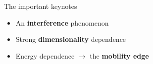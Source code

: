 \documentclass[1pt]{beamer}
\begin{document}
\begin{frame}{The important keynotes}
\begin{minipage}[c]{0.9\textwidth}
\begin{itemize}
\item An \textbf{interference} phenomenon
\vspace{12mm}		
\item Strong \textbf{dimensionality} dependence
\vspace{12mm}
\item Energy dependence $\rightarrow$ the \textbf{mobility edge}

\end{itemize}
\end{minipage}
\end{frame}



\end{document}
